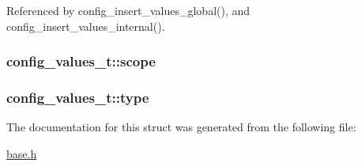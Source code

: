Referenced by config\-\_\-insert\-\_\-values\-\_\-global(), and config\-\_\-insert\-\_\-values\-\_\-internal().

\hypertarget{structconfig__values__t_ae97d567f5b8c756a90ee74d85eced857}{
\subsubsection[{scope}]{ config\-\_\-values\-\_\-t\-::scope}}\label{structconfig__values__t_ae97d567f5b8c756a90ee74d85eced857}
\hypertarget{structconfig__values__t_aad0d4f1c7bef4a3c3df223c6f7dff2cc}{
\subsubsection[{type}]{ config\-\_\-values\-\_\-t\-::type}}\label{structconfig__values__t_aad0d4f1c7bef4a3c3df223c6f7dff2cc}


The documentation for this struct was generated from the following file\-:\begin{DoxyCompactItemize}
\item 
\hyperlink{base_8h}{base.\-h}\end{DoxyCompactItemize}
